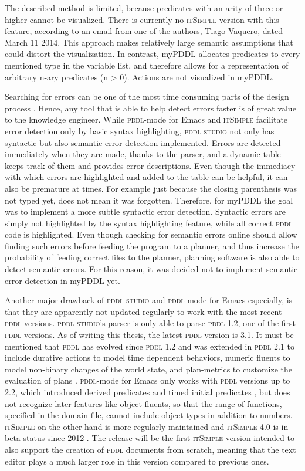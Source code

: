 \documentclass[a4paper,12pt]{report}
\newcommand{\mypddl}{\smallerft[0.8]{myPDDL}\xspace}
\newcommand{\pddlstudio}{\textsc{pddl studio}\xspace}
\newcommand{\itsimple}{\textsc{itSimple}\xspace}
\newcommand{\pddlmode}{\textsc{pddl}-mode\xspace}
\newcommand{\pddl}{\textsc{pddl}\xspace}
\newcommand\smallerft[2][0.85]{{\scalefont{#1}#2}}
\begin{document}
The described method is limited, because predicates with an arity of
three or higher cannot be visualized. There is currently no \itsimple
version with this feature, according to an email from one of the
authors, Tiago Vaquero, dated March 11 2014. This approach makes
relatively large semantic assumptions that could distort the
visualization. In contrast, \mypddl allocates predicates to every
mentioned type in the variable list, and therefore allows for a
representation of arbitrary n-ary predicates (n > 0). Actions are not
visualized in \mypddl.

Searching for errors can be one of the most time consuming parts of
the design process \cite{gill1951diagnosis}. Hence, any tool that is
able to help detect errors faster is of great value to the knowledge
engineer. While \pddlmode for Emacs and \itsimple facilitate error
detection only by basic syntax highlighting, \pddlstudio not only has
syntactic but also semantic error detection implemented. Errors are
detected immediately when they are made, thanks to the parser, and a
dynamic table keeps track of them and provides error descriptions.
Even though the immediacy with which errors are highlighted and added
to the table can be helpful, it can also be premature at times. For
example just because the closing parenthesis was not typed yet, does
not mean it was forgotten. Therefore, for \mypddl the goal was to
implement a more subtle syntactic error detection. Syntactic errors
are simply not highlighted by the syntax highlighting feature, while
all correct \pddl code is highlighted. Even though checking for
semantic errors online should allow finding such errors before feeding
the program to a planner, and thus increase the probability of feeding
correct files to the planner, planning software is also able to detect
semantic errors. For this reason, it was decided not to implement
semantic error detection in \mypddl yet.


Another major drawback of \pddlstudio and \pddlmode for Emacs
especially, is that they are apparently not updated regularly to work
with the most recent \pddl versions. \pddlstudio's parser is only able
to parse \pddl 1.2, one of the first \pddl versions. As of writing
this thesis, the latest \pddl version is 3.1. It must be mentioned
that \pddl has evolved since \textsc{pddl} 1.2 and was extended in
\pddl 2.1 to include durative actions to model time dependent
behaviors, numeric fluents to model non-binary changes of the world
state, and plan-metrics to customize the evaluation of plans
\cite{fox2003pddl2}. \pddlmode for Emacs only works with \pddl
versions up to 2.2, which introduced derived predicates and timed
initial predicates \cite{edelkamp2004pddl2}, but does not recognize
later features like object-fluents, so that the range of functions,
specified in the domain file, cannot include object-types in addition
to numbers. \itsimple on the other hand is more regularly maintained
and \itsimple4.0 is in beta status since 2012 \cite{itsimpleonline}.
The release will be the first \itsimple version intended to also
support the creation of \pddl documents from scratch, meaning that the
text editor plays a much larger role in this version compared to
previous ones.
\end{document}
